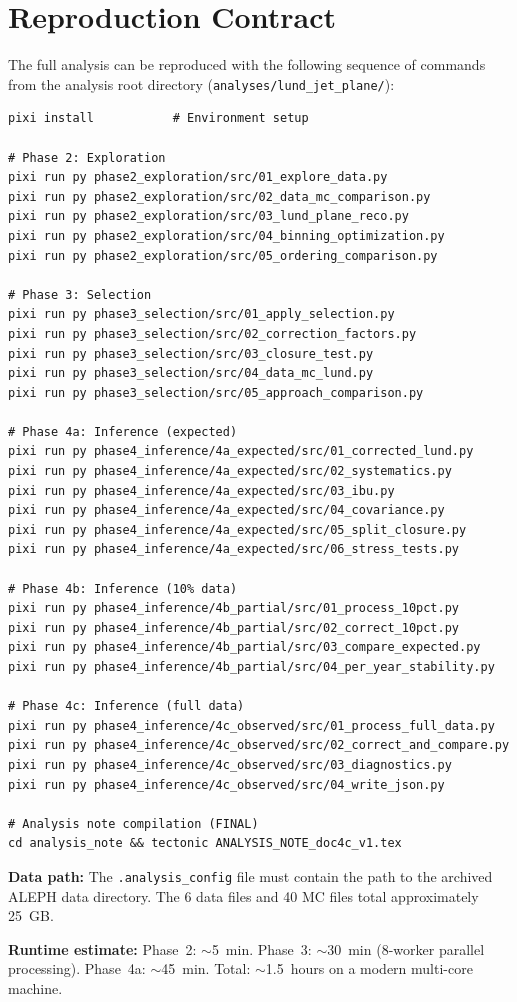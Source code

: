\documentclass[11pt,a4paper]{article}
\begin{document}
\section{Reproduction Contract}
\label{app:reproduction}

The full analysis can be reproduced with the following sequence of
commands from the analysis root directory
(\texttt{analyses/lund\_jet\_plane/}):

{\small
\begin{verbatim}
pixi install           # Environment setup

# Phase 2: Exploration
pixi run py phase2_exploration/src/01_explore_data.py
pixi run py phase2_exploration/src/02_data_mc_comparison.py
pixi run py phase2_exploration/src/03_lund_plane_reco.py
pixi run py phase2_exploration/src/04_binning_optimization.py
pixi run py phase2_exploration/src/05_ordering_comparison.py

# Phase 3: Selection
pixi run py phase3_selection/src/01_apply_selection.py
pixi run py phase3_selection/src/02_correction_factors.py
pixi run py phase3_selection/src/03_closure_test.py
pixi run py phase3_selection/src/04_data_mc_lund.py
pixi run py phase3_selection/src/05_approach_comparison.py

# Phase 4a: Inference (expected)
pixi run py phase4_inference/4a_expected/src/01_corrected_lund.py
pixi run py phase4_inference/4a_expected/src/02_systematics.py
pixi run py phase4_inference/4a_expected/src/03_ibu.py
pixi run py phase4_inference/4a_expected/src/04_covariance.py
pixi run py phase4_inference/4a_expected/src/05_split_closure.py
pixi run py phase4_inference/4a_expected/src/06_stress_tests.py

# Phase 4b: Inference (10% data)
pixi run py phase4_inference/4b_partial/src/01_process_10pct.py
pixi run py phase4_inference/4b_partial/src/02_correct_10pct.py
pixi run py phase4_inference/4b_partial/src/03_compare_expected.py
pixi run py phase4_inference/4b_partial/src/04_per_year_stability.py

# Phase 4c: Inference (full data)
pixi run py phase4_inference/4c_observed/src/01_process_full_data.py
pixi run py phase4_inference/4c_observed/src/02_correct_and_compare.py
pixi run py phase4_inference/4c_observed/src/03_diagnostics.py
pixi run py phase4_inference/4c_observed/src/04_write_json.py

# Analysis note compilation (FINAL)
cd analysis_note && tectonic ANALYSIS_NOTE_doc4c_v1.tex
\end{verbatim}
}

\textbf{Data path:} The \texttt{.analysis\_config} file must contain
the path to the archived ALEPH data directory.  The 6 data files and
40 MC files total approximately 25~GB.

\textbf{Runtime estimate:} Phase~2: $\sim$5~min.  Phase~3: $\sim$30~min
(8-worker parallel processing).  Phase~4a: $\sim$45~min.  Total:
$\sim$1.5~hours on a modern multi-core machine.
\end{document}

